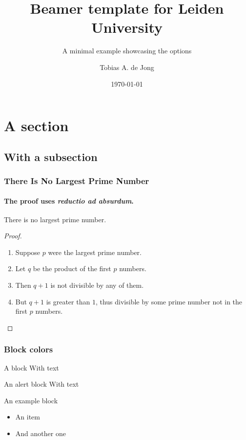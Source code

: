 \documentclass[9pt,aspectratio=34,english]{beamer}
\title{Beamer template for Leiden University}
\subtitle{A minimal example showcasing the options}
\author{Tobias A. de Jong}
\institute[LION]{Leiden Institute of Physics}
\date{\today}
\begin{document}
\begin{frame}
	\titlepage
\end{frame}

\begin{frame}
	\tableofcontents
\end{frame}
\section{A section}
\subsection{With a subsection}
\begin{frame}
\frametitle{There Is No Largest Prime Number}
\framesubtitle{The proof uses \textit{reductio ad absurdum}.}
\begin{theorem}
There is no largest prime number.
\end{theorem}
\begin{proof}
\begin{enumerate}
\item<1-| alert@1> Suppose $p$ were the largest prime number.
\item<2-> Let $q$ be the product of the first $p$ numbers.
\item<3-> Then $q+1$ is not divisible by any of them.
\item<1-> But $q + 1$ is greater than $1$, thus divisible by some prime
number not in the first $p$ numbers.\qedhere
\end{enumerate}
\end{proof}
\end{frame}

\begin{frame}
	\frametitle{Block colors}
	\begin{block}{A block}
		With text
	\end{block}
	\begin{alertblock}{An alert block}
		With text
	\end{alertblock}
	\begin{exampleblock}{An example block}
		\begin{itemize}
			\item An item
			\item And another one
		\end{itemize}
	\end{exampleblock}
\end{frame}
\end{document}
